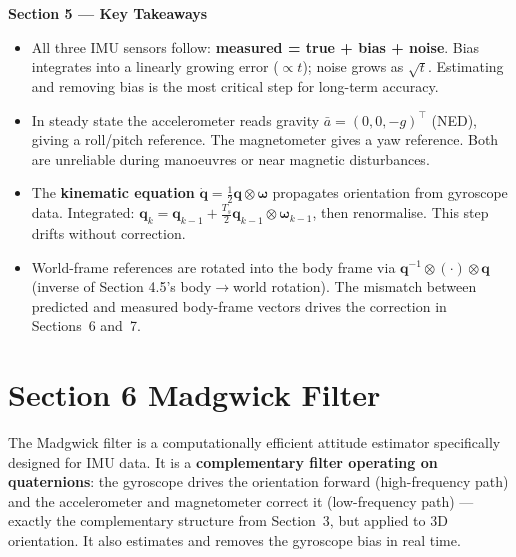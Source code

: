 \documentclass[12pt, a4paper]{article}
\begin{document}
\begin{keybox}
  \textbf{Section 5 --- Key Takeaways}
  \begin{itemize}[leftmargin=1.2em, itemsep=2pt]
    \item All three IMU sensors follow:
      \textbf{measured = true + bias + noise}.
      Bias integrates into a linearly growing error ($\propto t$); noise
      grows as $\sqrt{t}$.
      Estimating and removing bias is the most critical step for long-term
      accuracy.

    \item In steady state the accelerometer reads gravity
      $\bar{a} = (0,0,-g)^\top$ (NED), giving a roll/pitch reference.
      The magnetometer gives a yaw reference.
      Both are unreliable during manoeuvres or near magnetic disturbances.

    \item The \textbf{kinematic equation}
      $\dot{\mathbf{q}} = \tfrac{1}{2}\mathbf{q}\otimes\boldsymbol{\omega}$
      propagates orientation from gyroscope data.
      Integrated: $\mathbf{q}_k = \mathbf{q}_{k-1} +
      \tfrac{T_s}{2}\mathbf{q}_{k-1}\otimes\boldsymbol{\omega}_{k-1}$,
      then renormalise.
      This step drifts without correction.

    \item World-frame references are rotated into the body frame via
      $\mathbf{q}^{-1}\otimes(\cdot)\otimes\mathbf{q}$ (inverse of Section
      4.5's body$\to$world rotation).
      The mismatch between predicted and measured body-frame vectors drives
      the correction in Sections~6 and~7.
  \end{itemize}
\end{keybox}

\newpage
\section*{Section 6 \quad Madgwick Filter}

The Madgwick filter is a computationally efficient attitude estimator
specifically designed for IMU data.
It is a \textbf{complementary filter operating on quaternions}: the gyroscope
drives the orientation forward (high-frequency path) and the accelerometer
and magnetometer correct it (low-frequency path) --- exactly the
complementary structure from Section~3, but applied to 3D orientation.
It also estimates and removes the gyroscope bias in real time.
\end{document}
